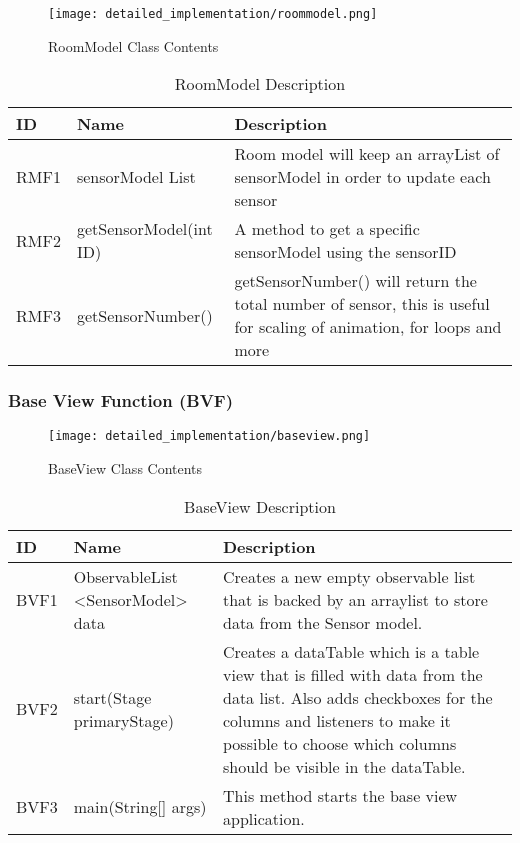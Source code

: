 \documentclass[../document]{subfiles}
\begin{document}
\begin{figure}[H]
\centering
\texttt{[image: detailed\_implementation/roommodel.png]}
\caption{RoomModel Class Contents}
\end{figure}

\begin{table}[H]
\caption{RoomModel Description}
\centering
\begin{tabularx}{\textwidth}{|L{1.2cm}|L{3.5cm}|X|}
	\hline
	ID
	&Name
	&Description
	\\ \hline RMF1
	&sensorModel List
	&Room model will keep an arrayList of sensorModel in order to update each sensor
	\\ \hline RMF2
	&getSensorModel(int ID)
	&A method to get a specific sensorModel using the sensorID
	\\ \hline RMF3
	&getSensorNumber()
	&getSensorNumber() will return the total number of sensor, this is useful for scaling of animation, for loops and more
	\\ \hline 
\end{tabularx}
\end{table}

\subsubsection{Base View Function (BVF)}

\begin{figure}[H]
\centering
\texttt{[image: detailed\_implementation/baseview.png]}
\caption{BaseView Class Contents}
\end{figure}

\begin{table}[H]
\caption{BaseView Description}
\centering
\begin{tabularx}{\textwidth}{|L{1.2cm}|L{3.5cm}|X|}
	\hline
	ID
	&Name
	&Description
	\\ \hline BVF1
	&ObservableList <SensorModel> data
	&Creates a new empty observable list that is backed by an arraylist to store data from the Sensor model.
	\\ \hline BVF2
	&start(Stage primaryStage)
	&Creates a dataTable which is a table view that is filled with data from the data list. Also adds checkboxes for the columns and listeners to make it possible to choose which columns should be visible in the dataTable.
	\\ \hline BVF3
	&main(String[] args)
	&This method starts the base view application.
	\\ \hline 
\end{tabularx}
\end{table}
\end{document}
